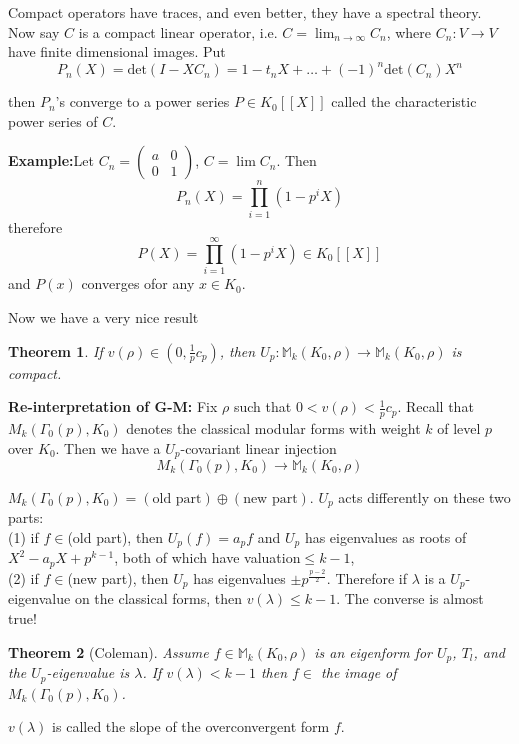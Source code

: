 \documentclass{article}%
\newtheorem{thm}{Theorem}
\begin{document}
Compact operators have traces, and even better, they have a spectral theory.
Now say $C$ is a compact linear operator, i.e. $C=\lim_{n\to\infty}C_n$,
where $C_n:V\to V$
have finite dimensional images. Put 
$$P_n(X)=\text{det}(I-XC_n)=1-t_nX+\dots+(-1)^n\text{det}(C_n)X^n$$

then $P_n$'s converge to a power series $P\in K_0[[X]]$ called the
characteristic power
series of $C$.

{\bf Example:}Let $C_n=\begin{pmatrix}a & 0\\ 0 & 1\end{pmatrix}$, $C=\lim
C_n$.
Then 
$$P_n(X)=\prod_{i=1}^{n}(1-p^iX)$$
therefore 
$$P(X)=\prod_{i=1}^{\infty}(1-p^iX)\in K_0[[X]]$$
and $P(x)$ converges ofor any $x\in K_0$.

\vspace{.2in}
Now we have a very nice result
\begin{thm}
If $v(\rho)\in (0,\frac1pc_p)$, then
$U_p:\mathbb{M}_k(K_0,\rho)\longrightarrow\mathbb{M}_k(K_0,\rho)$ is
compact.
\end{thm}

\vspace{0.2in}
{\bf Re-interpretation of G-M:} Fix $\rho$ such that $0<v(\rho)<\frac1pc_p$.
Recall that
$M_k(\Gamma_0(p),K_0)$ denotes the classical modular forms with weight $k$
of level $p$
over $K_0$. Then we have a $U_p$-covariant linear injection
$$M_k(\Gamma_0(p),K_0)\longrightarrow\mathbb{M}_k(K_0,\rho)$$
 
$M_k(\Gamma_0(p),K_0)=(\text{old part})\oplus(\text{new part})$. $U_p$ acts
differently
on these two parts: \\
(1) if $f\in$(old part), then $U_p(f)=a_pf$ and $U_p$ has eigenvalues as
roots of
$X^2-a_pX+p^{k-1}$, both of which have valuation$\leq k-1$,\\
(2) if $f\in$(new part), then $U_p$ has eigenvalues $\pm p^{\frac{p-2}2}$.
Therefore
if $\lambda$ is a $U_p$-eigenvalue on the classical forms, then
$v(\lambda)\leq k-1$.
The converse is almost true!

\begin{thm}[Coleman]
Assume $f\in\mathbb{M}_k(K_0,\rho)$ is an eigenform for $U_p$, $T_l$, and
the $U_p$-eigenvalue
is $\lambda$. If $v(\lambda)<k-1$ then $f\in$ the image of
$M_k(\Gamma_0(p),K_0)$.
\end{thm}

 $v(\lambda)$ is called the slope of the
overconvergent form $f$.
\end{document}
